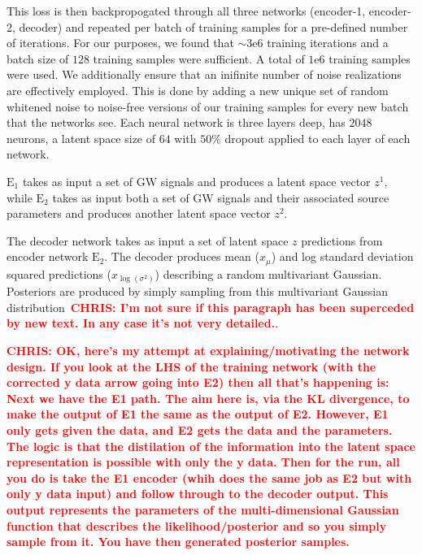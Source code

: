 \documentclass[%
showpacs,
 amsmath,amssymb,
 aps,
 twocolumn,
 prl,
 reprint,
floatfix,
]{revtex4-1}
\newcommand{\chris}[1]{\textbf{\textcolor{red}{CHRIS: #1}}}
\begin{document}
This loss is then backpropogated through all three networks 
(encoder-1, encoder-2, decoder) and repeated per batch of 
training samples for a pre-defined number of iterations. For our 
purposes, we found that $\sim3\textrm{e}6$ training iterations and 
a batch size of $128$ training samples were sufficient. A total 
of $1\textrm{e}6$ training samples were used. We additionally 
ensure that an inifinite number of noise realizations are effectively employed. This 
is done by adding a new unique set of random whitened noise to noise-free 
versions of our training samples for every new batch that the networks 
see. Each neural network is three layers deep, has $2048$ neurons, a latent 
space size of $64$ with $50\%$ dropout applied to each layer of each network.


$\textrm{E}_1$ takes as input a set of \ac{GW} signals and produces a latent
space vector $z^1$, while $\textrm{E}_2$ takes as input both a set of GW
signals and their associated source parameters and produces another latent
space vector $z^2$.

%
%
The decoder network takes as input a set of latent
space $z$ predictions from encoder network $\textrm{E}_2$.  The decoder
produces mean ($x_{\mu}$) and log standard deviation squared predictions
($x_{\log{(\sigma^{2})}}$) describing a random multivariant Gaussian.
Posteriors are produced by simply sampling from this multivariant Gaussian
distribution~\chris{I'm not sure if this paragraph has been superceded by new
text. In any case it's not very detailed.}.


\chris{OK, here's my attempt at explaining/motivating the network design. If
you look at the LHS of the training network (with the corrected y data arrow
going into E2) then all that's happening is:
%
Next we have the E1 path. The aim here is, via the KL divergence, to make the
output of E1 the same as the output of E2. However, E1 only gets given the
data, and E2 gets the data and the parameters. The logic is that the
distilation of the information into the latent space representation is possible
with only the y data.
%
Then for the run, all you do is take the E1 encoder (whih does the same job as
E2 but with only y data input) and follow through to the decoder output. This
output represents the parameters of the multi-dimensional Gaussian function
that describes the likelihood/posterior and so you simply sample from it. You
have then generated posterior samples.
}
\end{document}
